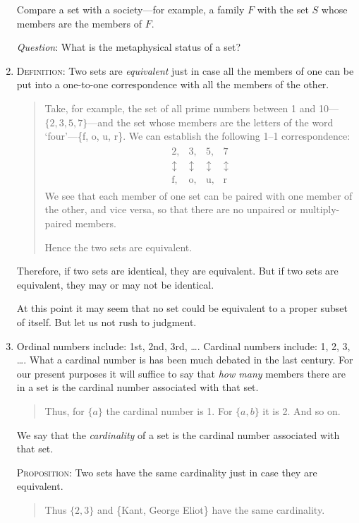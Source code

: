 \documentclass[polutonikogreek,english,twoside,openright]{article}
\begin{document}
\begin{enumerate}
  Compare a set with a society---for example, a family $F$ with the
  set $S$ whose members are the members of $F$.

  \emph{Question}: What is the metaphysical status of a set?
\item \textsc{Definition}\label{equivalence}: Two sets are
  \emph{equivalent} just in case all the members of one can be put
  into a one-to-one correspondence with all the members of the other.
  \begin{quote}
    {\small Take, for example, the set of all prime
      numbers between 1 and 10---$\{2,3,5,7\}$---and the set whose
      members are the letters of the word `four'---\{f, o, u, r\}. We
      can establish the following 1--1 correspondence:
      \begin{align*}
        \begin{matrix}
          2,&3,&5,&7\\
          \updownarrow\, &\updownarrow\, & \updownarrow\, &\updownarrow\\
          \textrm{f},&\textrm{o},&\textrm{u},&\textrm{r}
        \end{matrix}
      \end{align*}
      We see that each member of one set can be paired with one member
      of the other, and vice versa, so that there are no unpaired or
      multiply-paired members.

Hence the two sets are equivalent.}
\end{quote}
Therefore, if two sets are identical, they are equivalent. But if two
sets are equivalent, they may or may not be identical.

At this point it may seem that no set could be equivalent to a proper
subset of itself. But let us not rush to judgment.
\item \label{cardinal}Ordinal numbers include: 1st, 2nd, 3rd,
  \ldots. Cardinal numbers include: 1, 2, 3, \ldots. What a cardinal
  number is has been much debated in the last century. For our present
  purposes it will suffice to say that \emph{how many} members there
  are in a set is the cardinal number associated with that set.
  \begin{quote} {\small Thus, for $\{a\}$ the cardinal number is
      1. For $\{a,b\}$ it is 2. And so on.}
  \end{quote}
  We say that the \emph{cardinality} of a set is the cardinal number
  associated with that set.

  \textsc{Proposition}: Two sets have the same cardinality just in
  case they are equivalent.
  \begin{quote} {\small Thus $\{2,3\}$ and \{Kant, George Eliot\} have
      the same cardinality.  }\end{quote}


\end{enumerate}
\end{document}
